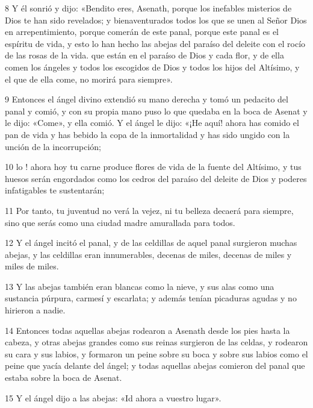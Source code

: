 \par 8 Y él sonrió y dijo: «Bendito eres, Asenath, porque los inefables misterios de Dios te han sido revelados; y bienaventurados todos los que se unen al Señor Dios en arrepentimiento, porque comerán de este panal, porque este panal es el espíritu de vida, y esto lo han hecho las abejas del paraíso del deleite con el rocío de las rosas de la vida. que están en el paraíso de Dios y cada flor, y de ella comen los ángeles y todos los escogidos de Dios y todos los hijos del Altísimo, y el que de ella come, no morirá para siempre».

\par 9 Entonces el ángel divino extendió su mano derecha y tomó un pedacito del panal y comió, y con su propia mano puso lo que quedaba en la boca de Asenat y le dijo: «Come», y ella comió. Y el ángel le dijo: «¡He aquí! ahora has comido el pan de vida y has bebido la copa de la inmortalidad y has sido ungido con la unción de la incorrupción;

\par 10 lo ! ahora hoy tu carne produce flores de vida de la fuente del Altísimo, y tus huesos serán engordados como los cedros del paraíso del deleite de Dios y poderes infatigables te sustentarán;

\par 11 Por tanto, tu juventud no verá la vejez, ni tu belleza decaerá para siempre, sino que serás como una ciudad madre amurallada para todos.

\par 12 Y el ángel incitó el panal, y de las celdillas de aquel panal surgieron muchas abejas, y las celdillas eran innumerables, decenas de miles, decenas de miles y miles de miles.

\par 13 Y las abejas también eran blancas como la nieve, y sus alas como una sustancia púrpura, carmesí y escarlata; y además tenían picaduras agudas y no hirieron a nadie.

\par 14 Entonces todas aquellas abejas rodearon a Asenath desde los pies hasta la cabeza, y otras abejas grandes como sus reinas surgieron de las celdas, y rodearon su cara y sus labios, y formaron un peine sobre su boca y sobre sus labios como el peine que yacía delante del ángel; y todas aquellas abejas comieron del panal que estaba sobre la boca de Asenat.

\par 15 Y el ángel dijo a las abejas: «Id ahora a vuestro lugar».

